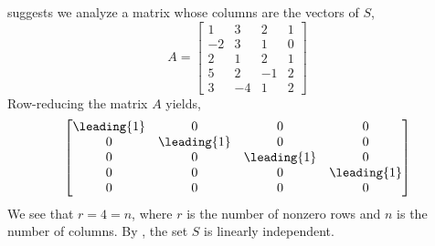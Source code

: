  suggests we analyze a matrix whose columns are the vectors of $S$,
%
\begin{equation*}
A=\begin{bmatrix}
1 & 3 & 2 & 1\\
-2 & 3 & 1 & 0\\
2 & 1 & 2 & 1\\
5 & 2 & -1 & 2\\
3 & -4 & 1 & 2
\end{bmatrix}
\end{equation*}
%
Row-reducing the matrix $A$ yields,
%
\begin{equation*}
\begin{bmatrix}
\leading{1} & 0 & 0 & 0\\
0 & \leading{1} & 0 & 0\\
0 & 0 & \leading{1} & 0\\
0 & 0 & 0 & \leading{1}\\
0 & 0 & 0 & 0
\end{bmatrix}
\end{equation*}
%
We see that $r=4=n$, where $r$ is the number of nonzero rows and $n$ is the number of columns.  By , the set $S$ is linearly independent.
